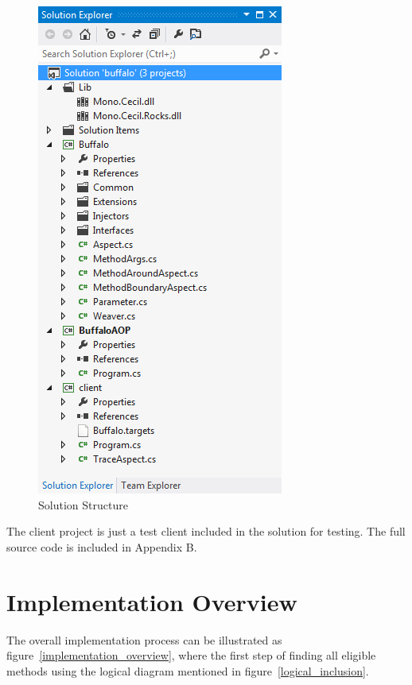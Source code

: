 \begin{figure}[H]
  \includegraphics[scale=1.0]{SolutionExplorer.PNG}
  \centering
  \caption{Solution Structure\label{solutionexplorer}}
\end{figure}

The client project is just a test client included in the solution for testing. The full source code is included in Appendix B.

\section{Implementation Overview}

The overall implementation process can be illustrated as figure~\ref{implementation_overview}, where the first step of finding all eligible methods using the logical diagram mentioned in figure~\ref{logical_inclusion}.

